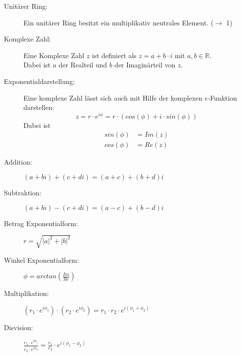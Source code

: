 \begin{description}
  \item [Unitärer Ring:]
    Ein unitärer Ring besitzt ein multiplikativ neutrales Element. 
    ($\rightarrow$ 1)

  \item [Komplexe Zahl:] 
    Eine Komplexe Zahl $z$ ist definiert als $z = a + b\cdot i$ mit 
    $a,b \in \mathbb{R}$.\\
    Dabei ist $a$ der Realteil und $b$ der Imaginärteil von $z$.

  \item [Exponentialdarstellung:]
    Eine komplexe Zahl lässt sich auch mit Hilfe der komplexen $e$-Funktion 
    darstellen:
    \begin{equation*}
      z = r \cdot e^{i\phi} = r \cdot (cos(\phi) + i \cdot sin(\phi))
    \end{equation*}
    Dabei ist
    \begin{equation*}
      \begin{aligned}
        sin(\phi) &= Im(z)\\
        cos(\phi) &= Re(z)
      \end{aligned}
    \end{equation*}
\end{description}

\begin{framed} 
  \begin{description}
    \item [Addition:]
      $(a + bi) + (c + di) = (a + c) + (b + d)i$

    \item [Subtraktion:]
      $(a + bi) - (c + di) = (a - c) + (b - d)i$

    \item [Betrag Exponentialform:]
      $r = \sqrt{|a|^2 + |b|^2}$

    \item [Winkel Exponentialform:]
      $\phi = arctan(\frac{Im}{Re})$

    \item  [Multiplikation:]
      $(r_1 \cdot e^{i\phi_1}) \cdot (r_2 \cdot e^{i\phi_2}) = r_1 \cdot r_2 \cdot e^{i(\phi_1+\phi_2)}$
    
    \item [Disvision:]
      $\frac{r_1 \cdot e^{i\phi_1}}{r_2 \cdot e^{i\phi_2}} = \frac{r_1}{r_2} \cdot e^{i(\phi_1-\phi_2)}$
  \end{description}
\end{framed}